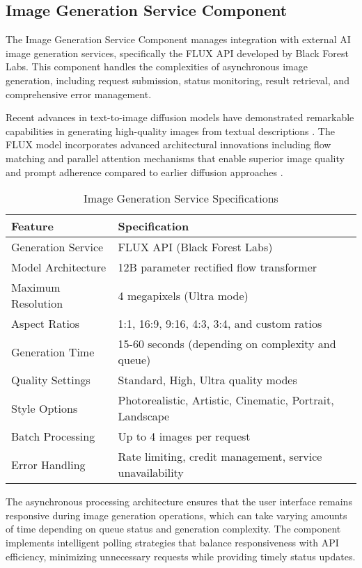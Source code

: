 \subsection{Image Generation Service Component}

The Image Generation Service Component manages integration with external AI image generation services, specifically the FLUX API developed by Black Forest Labs. This component handles the complexities of asynchronous image generation, including request submission, status monitoring, result retrieval, and comprehensive error management.

Recent advances in text-to-image diffusion models have demonstrated remarkable capabilities in generating high-quality images from textual descriptions \cite{yang2023text, saharia2022photorealistic}. The FLUX model incorporates advanced architectural innovations including flow matching and parallel attention mechanisms that enable superior image quality and prompt adherence compared to earlier diffusion approaches \cite{liang2024rich}.

\begin{table}[H]
\centering
\caption{Image Generation Service Specifications}
\label{tab:imggen_specifications}
\begin{tabular}{|l|p{8cm}|}
\hline
\textbf{Feature} & \textbf{Specification} \\
\hline
Generation Service & FLUX API (Black Forest Labs) \\
\hline
Model Architecture & 12B parameter rectified flow transformer \\
\hline
Maximum Resolution & 4 megapixels (Ultra mode) \\
\hline
Aspect Ratios & 1:1, 16:9, 9:16, 4:3, 3:4, and custom ratios \\
\hline
Generation Time & 15-60 seconds (depending on complexity and queue) \\
\hline
Quality Settings & Standard, High, Ultra quality modes \\
\hline
Style Options & Photorealistic, Artistic, Cinematic, Portrait, Landscape \\
\hline
Batch Processing & Up to 4 images per request \\
\hline
Error Handling & Rate limiting, credit management, service unavailability \\
\hline
\end{tabular}
\end{table}

The asynchronous processing architecture ensures that the user interface remains responsive during image generation operations, which can take varying amounts of time depending on queue status and generation complexity. The component implements intelligent polling strategies that balance responsiveness with API efficiency, minimizing unnecessary requests while providing timely status updates.

